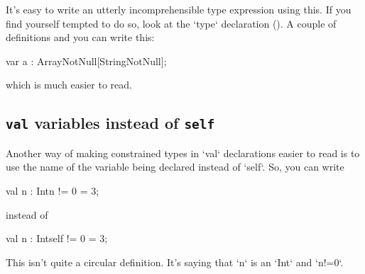 It's easy to write an utterly incomprehensible type expression using this.  If
you find yourself tempted to do so, look at the \xcd`type` declaration
().  A couple of definitions and you can write
this: 
\begin{xtennum}[]
var a : ArrayNotNull[StringNotNull]; 
\end{xtennum}
which is much easier to read.


\subsection{{\tt val} variables instead of {\tt self}}

Another way of making constrained types in \xcd`val` declarations easier to
read is to use the name of the variable being declared instead of \xcd`self`.  
So, you can write 
\begin{xtennum}[]
val n : Int{n != 0} = 3;
\end{xtennum}
instead of
\begin{xtennum}[]
val n : Int{self != 0} = 3;
\end{xtennum}
This isn't quite a circular definition.  It's saying that \xcd`n` is an
\xcd`Int` and \xcd`n!=0`.  

